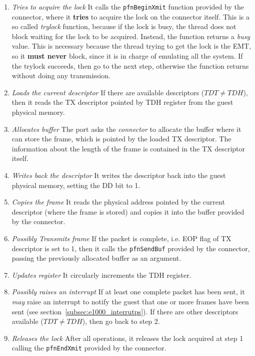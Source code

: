 \documentclass[a4paper, 12pt, titlepage]{report}
\begin{document}
\begin{enumerate}
\item \textit{Tries to acquire the lock} It calls the \texttt{pfnBeginXmit} function provided by the connector, where it \textbf{tries} to acquire the lock on the connector itself. This is a so called \textit{trylock} function, because if the lock is busy, the thread does not block waiting for the lock to be acquired. Instead, the function returns a \textit{busy} value. This is necessary because the thread trying to get the lock is the EMT, so it \textbf{must never} block, since it is in charge of emulating all the system.
If the trylock succeeds, then go to the next step, otherwise the function returns without doing any transmission.
\item \textit{Loads the current descriptor} If there are available descriptors ($TDT \neq TDH$), then it reads the TX descriptor pointed by TDH register from the guest physical memory.
\item \textit{Allocates buffer} The port asks the \textit{connector} to allocate the buffer where it can store the frame, which is pointed by the loaded TX descriptor. The information about the length of the frame is contained in the TX descriptor itself.
\item \textit{Writes back the descriptor} It writes the descriptor back into the guest physical memory, setting the DD bit to 1.
\item \textit{Copies the frame} It reads the physical address pointed by the current descriptor (where the frame is stored) and copies it into the buffer provided by the connector.
\item \textit{Possibly Transmits frame} If the packet is complete, i.e. EOP flag of TX descriptor is set to 1, then it calls the \texttt{pfnSendBuf} provided by the connector, passing the previously allocated buffer as an argument.
\item \textit{Updates register} It circularly increments the TDH register.
\item \textit{Possibly raises an interrupt} If at least one complete packet has been sent, it \textit{may} raise an interrupt to notify the guest that one or more frames have been sent (see section~\ref{subsec:e1000_interrutps}). If there are other descriptors available ($TDT \neq TDH$), then go back to step 2.
\item \textit{Releases the lock} After all operations, it releases the lock acquired at step 1 calling the \texttt{pfnEndXmit} provided by the connector.
\end{enumerate}
\end{document}
